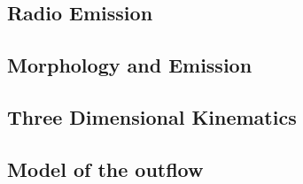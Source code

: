 \documentclass[../template.tex]{subfiles}
\begin{document}
	\subsection{Radio Emission}
	
	\subsection{Morphology and Emission}
	
	
	\subsection{Three Dimensional Kinematics}
	
	\subsection{Model of the outflow}
	
\end{document}
